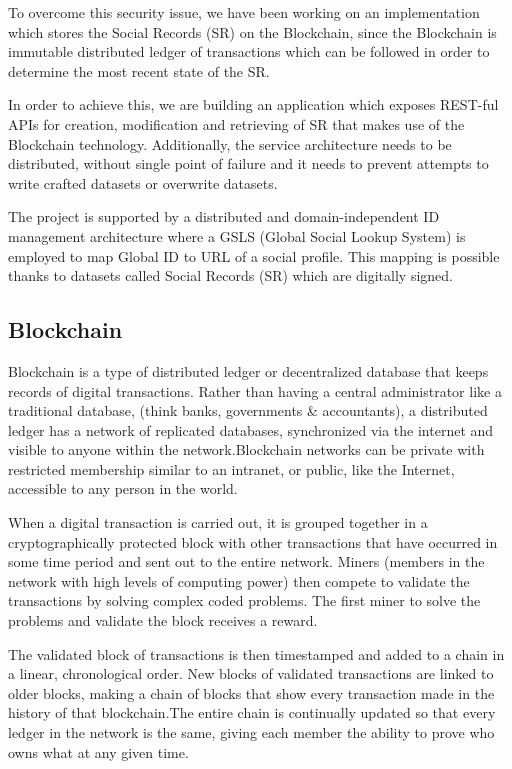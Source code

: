 To overcome this security issue, we have been working on an implementation which stores the Social Records (SR) on the Blockchain, since the Blockchain is immutable distributed ledger of transactions which can be followed in order to determine the most recent state of the SR.

In order to achieve this, we are building an application which exposes REST-ful APIs for creation, modification and retrieving of SR that makes use of the Blockchain technology. Additionally, the service architecture needs to be distributed, without single point of failure and it needs to prevent attempts to write crafted datasets or overwrite datasets.


The project is supported by a distributed and domain-independent ID management architecture where a GSLS (Global Social Lookup System) is employed to map Global ID to URL of a social profile. This mapping is possible thanks to datasets called Social Records (SR) which are digitally signed.

\subsection{Blockchain}

Blockchain is a type of distributed ledger or decentralized database that keeps records of digital transactions. Rather than having a central administrator like a traditional database, (think banks, governments \& accountants), a distributed ledger has a network of replicated databases, synchronized via the internet and visible to anyone within the network.Blockchain networks can be private with restricted membership similar to an intranet, or public, like the Internet, accessible to any person in the world.


When a digital transaction is carried out, it is grouped together in a cryptographically protected block with other transactions that have occurred in some time period and sent out to the entire network. Miners (members in the network with high levels of computing power) then compete to validate the transactions by solving complex coded problems. The first miner to solve the problems and validate the block receives a reward.

The validated block of transactions is then timestamped and added to a chain in a linear, chronological order. New blocks of validated transactions are linked to older blocks, making a chain of blocks that show every transaction made in the history of that blockchain.The entire chain is continually updated so that every ledger in the network is the same, giving each member the ability to prove who owns what at any given time.

